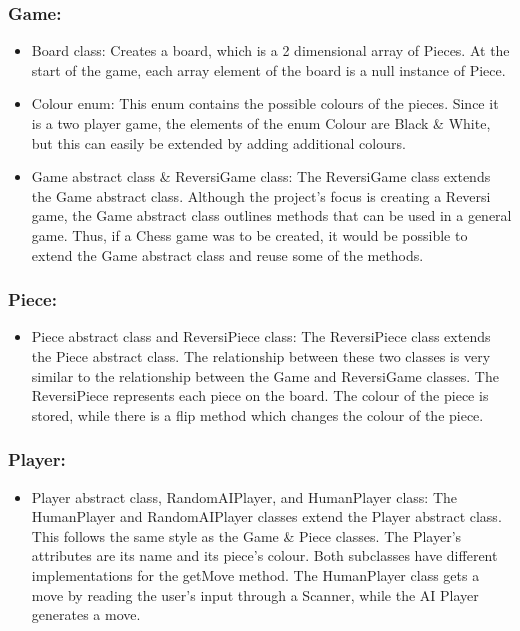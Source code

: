 \documentclass[english]{article}
\begin{document}
\subsubsection{Game:}
\begin{itemize}
\item Board class: Creates a board, which is a 2 dimensional array of Pieces.
At the start of the game, each array element of the board is a null
instance of Piece.
\item Colour enum: This enum contains the possible colours of the pieces.
Since it is a two player game, the elements of the enum Colour are
Black \& White, but this can easily be extended by adding additional
colours.
\item Game abstract class \& ReversiGame class: The ReversiGame class extends
the Game abstract class. Although the project's focus is creating
a Reversi game, the Game abstract class outlines methods that can
be used in a general game. Thus, if a Chess game was to be created,
it would be possible to extend the Game abstract class and reuse some
of the methods.
\end{itemize}

\subsubsection{Piece:}
\begin{itemize}
\item Piece abstract class and ReversiPiece class: The ReversiPiece class
extends the Piece abstract class. The relationship between these two
classes is very similar to the relationship between the Game and ReversiGame
classes. The ReversiPiece represents each piece on the board. The
colour of the piece is stored, while there is a flip method which
changes the colour of the piece.
\end{itemize}

\subsubsection{Player:}
\begin{itemize}
\item Player abstract class, RandomAIPlayer, and HumanPlayer class: The
HumanPlayer and RandomAIPlayer classes extend the Player abstract
class. This follows the same style as the Game \& Piece classes. The
Player's attributes are its name and its piece's colour. Both subclasses
have different implementations for the getMove method. The HumanPlayer
class gets a move by reading the user's input through a Scanner, while
the AI Player generates a move.
\end{itemize}
\end{document}
